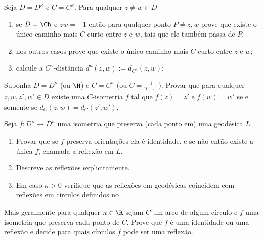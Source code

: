 \begin{problema}
Seja $D = D^\kappa$ e $C = C^\kappa$.
Para qualquer $z\neq w \in D$ 
\begin{enumerate}
\item se $D = \Ch$ e $zw=-1$ então para qualquer ponto $P\neq z,w$ prove que existe o único caminho
mais $C$-curto entre $z$ e $w$, tais que ele também passa de $P$.
\item nos outros casos prove que existe o único caminho mais $C$-curto entre $z$ e $w$;
\item calcule a $C^\kappa$-distância $d^\kappa(z,w) := d_{C^\kappa}(z,w)$;
\end{enumerate}
\end{problema}

\begin{problema}
Suponha $D = D^\kappa$ (ou $\H$) e $C = C^\kappa$ (ou $C = \frac{1}{\Im(z)}$).
Provar que para qualquer $z,w,z',w'\in D$ existe uma $C$-isometria $f$ tal que
$f(z) = z'$ e $f(w) = w'$ se e somente se $d_C(z,w) = d_C(z',w')$.
\end{problema}

\begin{problema}
Seja $f : D^\kappa \to D^\kappa$ uma isometria que preserva (cada ponto em) uma geodésica $L$.
\begin{enumerate}
\item Provar que se $f$ preserva orientações ela é identidade,
e se não então existe a única $f$, chamada a reflexão em $L$.
\item Descreve as reflexões explicitamente.
\item Em caso $\kappa>0$ verifique que as reflexões em geodésicas coincidem com reflexões em círculos
definidos no .
\end{enumerate}
Mais geralmente para qualquer $\kappa\in\R$
sejam $C$ um arco de algum círculo e $f$ uma isometria que preserva cada ponto de $C$.
Prove que $f$ é uma identidade ou uma reflexão e decide para quais círculos $f$ pode ser uma reflexão.
\end{problema}

